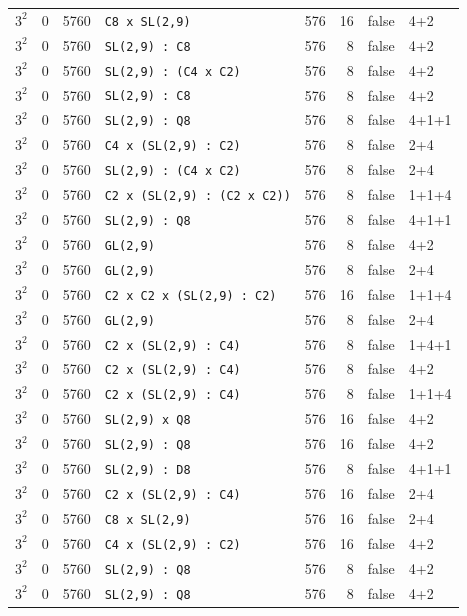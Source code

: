 \begin{longtable}{llrlrrll}
$3^2$ & 0 & 5760 & \texttt{C8 x SL(2,9)} & 576 & 16 & false & 4+2\\
$3^2$ & 0 & 5760 & \texttt{SL(2,9) : C8} & 576 & 8 & false & 4+2\\
$3^2$ & 0 & 5760 & \texttt{SL(2,9) : (C4 x C2)} & 576 & 8 & false & 4+2\\
$3^2$ & 0 & 5760 & \texttt{SL(2,9) : C8} & 576 & 8 & false & 4+2\\
$3^2$ & 0 & 5760 & \texttt{SL(2,9) : Q8} & 576 & 8 & false & 4+1+1\\
$3^2$ & 0 & 5760 & \texttt{C4 x (SL(2,9) : C2)} & 576 & 8 & false & 2+4\\
$3^2$ & 0 & 5760 & \texttt{SL(2,9) : (C4 x C2)} & 576 & 8 & false & 2+4\\
$3^2$ & 0 & 5760 & \texttt{C2 x (SL(2,9) : (C2 x C2))} & 576 & 8 & false & 1+1+4\\
$3^2$ & 0 & 5760 & \texttt{SL(2,9) : Q8} & 576 & 8 & false & 4+1+1\\
$3^2$ & 0 & 5760 & \texttt{GL(2,9)} & 576 & 8 & false & 4+2\\
$3^2$ & 0 & 5760 & \texttt{GL(2,9)} & 576 & 8 & false & 2+4\\
$3^2$ & 0 & 5760 & \texttt{C2 x C2 x (SL(2,9) : C2)} & 576 & 16 & false & 1+1+4\\
$3^2$ & 0 & 5760 & \texttt{GL(2,9)} & 576 & 8 & false & 2+4\\
$3^2$ & 0 & 5760 & \texttt{C2 x (SL(2,9) : C4)} & 576 & 8 & false & 1+4+1\\
$3^2$ & 0 & 5760 & \texttt{C2 x (SL(2,9) : C4)} & 576 & 8 & false & 4+2\\
$3^2$ & 0 & 5760 & \texttt{C2 x (SL(2,9) : C4)} & 576 & 8 & false & 1+1+4\\
$3^2$ & 0 & 5760 & \texttt{SL(2,9) x Q8} & 576 & 16 & false & 4+2\\
$3^2$ & 0 & 5760 & \texttt{SL(2,9) : Q8} & 576 & 16 & false & 4+2\\
$3^2$ & 0 & 5760 & \texttt{SL(2,9) : D8} & 576 & 8 & false & 4+1+1\\
$3^2$ & 0 & 5760 & \texttt{C2 x (SL(2,9) : C4)} & 576 & 16 & false & 2+4\\
$3^2$ & 0 & 5760 & \texttt{C8 x SL(2,9)} & 576 & 16 & false & 2+4\\
$3^2$ & 0 & 5760 & \texttt{C4 x (SL(2,9) : C2)} & 576 & 16 & false & 4+2\\
$3^2$ & 0 & 5760 & \texttt{SL(2,9) : Q8} & 576 & 8 & false & 4+2\\
$3^2$ & 0 & 5760 & \texttt{SL(2,9) : Q8} & 576 & 8 & false & 4+2\\

\end{longtable}
